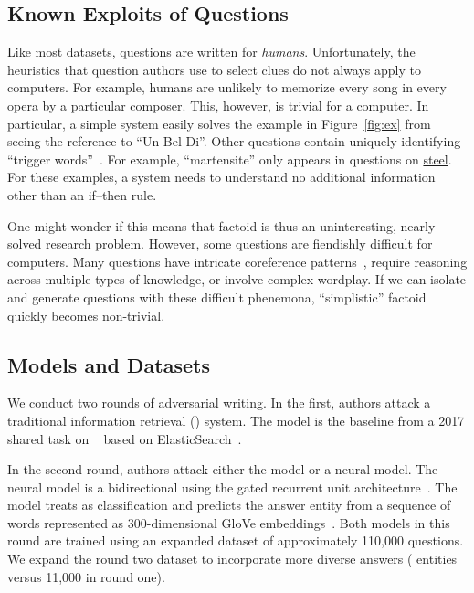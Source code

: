 \subsection{Known Exploits of \qb{} Questions}
\label{subsec:exploits}

Like most  datasets, \qb{} questions are
written for \emph{humans}. Unfortunately, the heuristics that
question authors use to select clues do not always apply to
computers. For example, humans are unlikely to memorize every song in
every opera by a particular composer. This, however, is trivial for a
computer. In particular, a simple  system easily
solves the example in Figure~\ref{fig:ex} from seeing the reference to
``Un Bel Di''. Other questions contain uniquely identifying ``trigger
words''~\cite{harris2006prisoner}. For example, ``martensite'' only appears in questions on
\underline{steel}. For these examples, a  system needs
to understand no additional information other than an if--then rule.

One might wonder if this means that factoid  is thus an
uninteresting, nearly solved research problem.  However, some \qb{}
questions are fiendishly difficult for computers. Many questions have
intricate coreference patterns~\cite{guha15coref}, require reasoning
across multiple types of knowledge, or involve complex wordplay. If we can
isolate and generate questions with these difficult phenemona,
``simplistic'' factoid  quickly becomes non-trivial.

\subsection{Models and Datasets}
\label{subsec:models}

We conduct two rounds of adversarial writing. In the first, authors
attack a traditional information retrieval () system.
The  model is the baseline from
a  2017 shared task on \qb{}~\cite{boydgraber2018nips} based on ElasticSearch~\cite{gormley2015elasticsearch}.

In the second round, authors attack either the  model or
a neural  model. The neural model is 
a bidirectional  using
the gated recurrent unit architecture~\cite{cho2014gru}.
The model treats \qb{} as classification and predicts the answer entity from a sequence of words
represented as 300-dimensional GloVe
embeddings~\cite{pennington2014glove}. Both models
in this round are trained using an expanded dataset of 
approximately 110,000 \qb{} questions. We expand the round two 
dataset to incorporate more diverse answers (\nansweroptions{} entities
versus 11,000 in round one).

